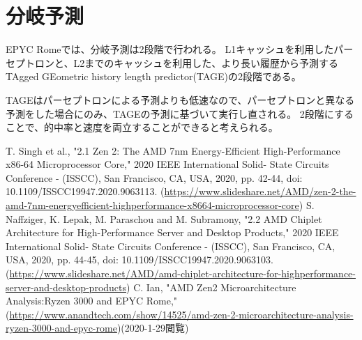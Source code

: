 \documentclass[a4paper,10pt]{jsarticle}
\begin{document}
\section{分岐予測}
EPYC Romeでは、分岐予測は2段階で行われる。
L1キャッシュを利用したパーセプトロンと、L2までのキャッシュを利用した、より長い履歴から予測するTAgged GEometric history length predictor(TAGE)の2段階である。

TAGEはパーセプトロンによる予測よりも低速なので、パーセプトロンと異なる予測をした場合にのみ、TAGEの予測に基づいて実行し直される。
2段階にすることで、的中率と速度を両立することができると考えられる。

\begin{thebibliography}{9}
  T. Singh et al., "2.1 Zen 2: The AMD 7nm Energy-Efficient High-Performance x86-64 Microprocessor Core," 2020 IEEE International Solid- State Circuits Conference - (ISSCC), San Francisco, CA, USA, 2020, pp. 42-44, doi: 10.1109/ISSCC19947.2020.9063113. (\url{https://www.slideshare.net/AMD/zen-2-the-amd-7nm-energyefficient-highperformance-x8664-microprocessor-core})
  S. Naffziger, K. Lepak, M. Paraschou and M. Subramony, "2.2 AMD Chiplet Architecture for High-Performance Server and Desktop Products," 2020 IEEE International Solid- State Circuits Conference - (ISSCC), San Francisco, CA, USA, 2020, pp. 44-45, doi: 10.1109/ISSCC19947.2020.9063103. (\url{https://www.slideshare.net/AMD/amd-chiplet-architecture-for-highperformance-server-and-desktop-products})
  C. Ian, "AMD Zen2 Microarchitecture Analysis:Ryzen 3000 and EPYC Rome," (\url{https://www.anandtech.com/show/14525/amd-zen-2-microarchitecture-analysis-ryzen-3000-and-epyc-rome})(2020-1-29閲覧)

\end{thebibliography}
\end{document}
